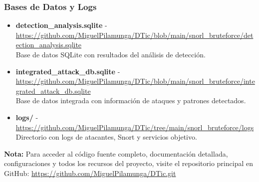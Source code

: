 \subsubsection*{Bases de Datos y Logs}
\begin{itemize}
    \item \textbf{detection\_analysis.sqlite} - \url{https://github.com/MiguelPilamunga/DTic/blob/main/snorl_bruteforce/detection_analysis.sqlite} \\
    Base de datos SQLite con resultados del análisis de detección.
    
    \item \textbf{integrated\_attack\_db.sqlite} - \url{https://github.com/MiguelPilamunga/DTic/blob/main/snorl_bruteforce/integrated_attack_db.sqlite} \\
    Base de datos integrada con información de ataques y patrones detectados.
    
    \item \textbf{logs/} - \url{https://github.com/MiguelPilamunga/DTic/tree/main/snorl_bruteforce/logs} \\
    Directorio con logs de atacantes, Snort y servicios objetivo.
\end{itemize}

\vspace{1cm}
\noindent\textbf{Nota:} Para acceder al código fuente completo, documentación detallada, configuraciones y todos los recursos del proyecto, visite el repositorio principal en GitHub: \url{https://github.com/MiguelPilamunga/DTic.git}